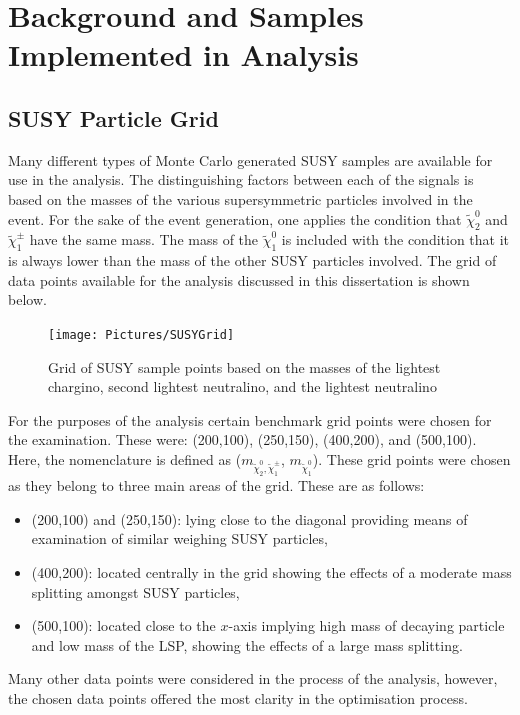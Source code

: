 \section{Background and Samples Implemented in Analysis}
\subsection{SUSY Particle Grid}
Many different types of Monte Carlo generated SUSY samples are available for use in the analysis. 
The distinguishing factors between each of the signals is based on the masses of the various supersymmetric particles involved in the event.
For the sake of the event generation, one applies the condition that $\tilde{\chi}^{0}_{2}$ and $\tilde{\chi}^{\pm}_{1}$ have the same mass.
The mass of the $\tilde{\chi}^{0}_{1}$ is included with the condition that it is always lower than the mass of the other SUSY particles involved. 
The grid of data points available for the analysis discussed in this dissertation is shown below.

\begin{figure}[htbp] %
   \centering
   \texttt{[image: Pictures/SUSYGrid]} 
   \caption{Grid of SUSY sample points based on the masses of the lightest chargino, second lightest neutralino, and the lightest neutralino}
   \label{fig:example}
\end{figure}

\noindent For the purposes of the analysis certain benchmark grid points were chosen for the examination. 
These were: (200,100), (250,150), (400,200), and (500,100).
Here, the nomenclature is defined as ($m_{\tilde{\chi}^{0}_2, \tilde{\chi}^{\pm}_{1}}$, $m_{\tilde{\chi}_{1}^{0}}$).
These grid points were chosen as they belong to three main areas of the grid.
These are as follows:
\begin{itemize}
\item (200,100) and (250,150): lying close to the diagonal providing means of examination of similar weighing SUSY particles,
\item (400,200): located centrally in the grid showing the effects of a moderate mass splitting amongst SUSY particles,
\item (500,100): located close to the $x$-axis implying high mass of decaying particle and low mass of the LSP, showing the effects of a large mass splitting.
\end{itemize}

\noindent Many other data points were considered in the process of the analysis, however, the chosen data points offered the most clarity in the optimisation process. 


